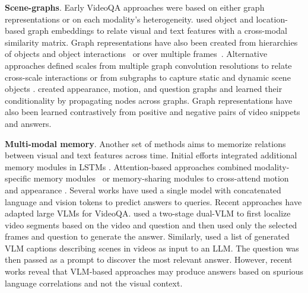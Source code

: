 

\noindent
\textbf{Scene-graphs}. Early VideoQA approaches were based on either graph representations \citep{jiang2020reasoning,tu2014joint} or on each modality's heterogeneity. \citet{huang2020location} used object and location-based graph embeddings to relate visual and text features with a cross-modal similarity matrix. Graph representations have also been created from hierarchies of objects and object interactions~\citep{dang2021hierarchical} or over multiple frames~\citep{liu2021hair}. Alternative approaches defined scales from multiple graph convolution resolutions to relate cross-scale interactions \citep{guo2021multi} or from subgraphs to capture static and dynamic scene objects  \citep{cherian20222}. \citet{park2021bridge} created appearance, motion, and question graphs and learned their conditionality by propagating nodes across graphs. Graph representations have also been learned contrastively \citep{xiao2023contrastive} from positive and negative pairs of video snippets and answers.


\noindent
\textbf{Multi-modal memory}. Another set of methods aims to memorize relations between visual and text features across time. Initial efforts integrated additional memory modules in LSTMs \citep{jang2017tgif,xu2017video,zeng2017leveraging}. Attention-based approaches \citep{ye2017video} combined modality-specific memory modules~\citep{fan2019heterogeneous} or memory-sharing modules to cross-attend motion and appearance \citep{gao2018motion,li2019beyond}. Several works \citep{gao2023mist,li2023discovering,yang2022zero,xue2023egocentric} have used a single model with concatenated language and vision tokens to predict answers to queries. Recent approaches have adapted large VLMs for VideoQA. \citet{yu2023self} used a two-stage dual-VLM to first localize video segments based on the video and question and then used only the selected frames and question to generate the answer. Similarly, \citet{min2024morevqa} used a list of generated VLM captions describing scenes in videos as input to an LLM. The question was then passed as a prompt to discover the most relevant answer. However, recent works \citep{xiao2024can} reveal that VLM-based approaches may produce answers based on spurious language correlations and not the visual context.



